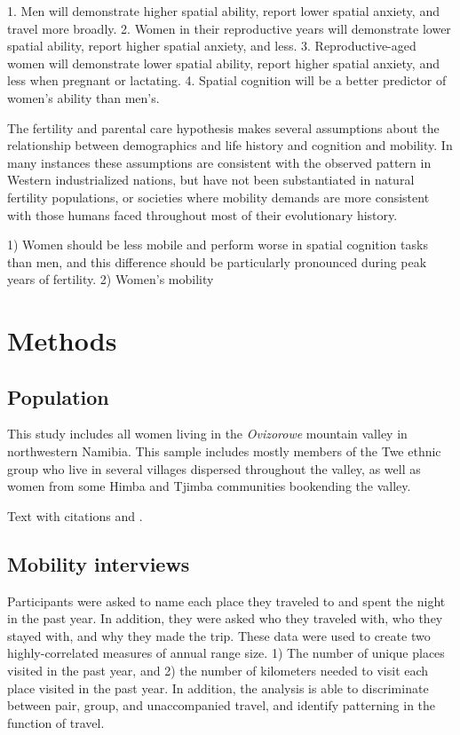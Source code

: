 1.  Men will demonstrate higher spatial ability, report lower spatial anxiety, and travel more broadly. 	
2.  Women in their reproductive years will demonstrate lower spatial ability, report higher spatial anxiety, and less.
3.  Reproductive-aged women will demonstrate lower spatial ability, report higher spatial anxiety, and less when pregnant or lactating.
4.  Spatial cognition will be a better predictor of women's ability than men's. 
	
The fertility and parental care hypothesis makes several assumptions about the relationship between demographics and life history and cognition and mobility.  In many instances these assumptions are consistent with the observed pattern in Western industrialized nations, but have not been substantiated in natural fertility populations, or societies where mobility demands are more consistent with those humans faced throughout most of their evolutionary history.

1) Women should be less mobile and perform worse in spatial cognition tasks than men, and this difference should be particularly pronounced during peak years of fertility.  2) Women's mobility 



\section{Methods}
\label{sec:2}
	\subsection{Population}
This study includes all women living in the \emph{Ovizorowe} mountain valley in northwestern Namibia.  This sample includes mostly members of the Twe ethnic group who live in several villages dispersed throughout the valley, as well as women from some Himba and Tjimba communities bookending the valley. 


Text with citations \cite{RefB} and \cite{RefJ}.
	\subsection{Mobility interviews}
	\label{sec:2.1}
Participants were asked to name each place they traveled to and spent the night in the past year.  In addition, they were asked who they traveled with, who they stayed with, and why they made the trip.  These data were used to create two highly-correlated measures of annual range size.  1) The number of unique places visited in the past year, and 2) the number of kilometers needed to visit each place visited in the past year.  In addition, the analysis is able to discriminate between pair, group, and unaccompanied travel, and identify patterning in the function of travel.
 	
